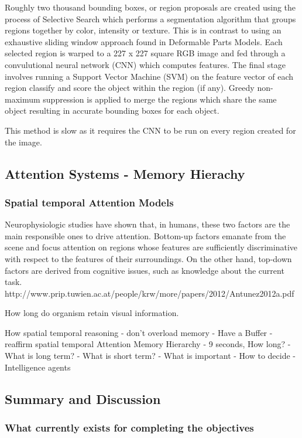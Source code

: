 \documentclass{mproj}
\begin{document}
Roughly two thousand bounding boxes, or region proposals are created using the process of Selective Search which performs a segmentation algorithm that groups regions together by color, intensity or texture.\cite{Sande2013} This is in contrast to using an exhaustive sliding window approach found in Deformable Parts Models.\cite{voc-release4} Each selected region is warped to a 227 x 227 square RGB image and fed through a convulutional neural network (CNN) which computes features. The final stage involves running a Support Vector Machine (SVM) on the feature vector of each region classify and score the object within the region (if any). Greedy non-maximum suppression is applied to merge the regions which share the same object resulting in accurate bounding boxes for each object. 

This method is slow as it requires the CNN to be run on every region created for the image.




\subsection{Attention Systems - Memory Hierachy}
\subsubsection{Spatial temporal Attention Models}
Neurophysiologic studies have shown that, in humans, these two 
factors are the main responsible ones to drive attention. Bottom-up factors emanate from the scene and 
focus attention on regions whose features are sufficiently discriminative with respect to the features 
of their surroundings. On the other hand, top-down factors are derived from cognitive issues, such as 
knowledge about the current task.
http://www.prip.tuwien.ac.at/people/krw/more/papers/2012/Antunez2012a.pdf

How long do organism retain visual information.

How spatial temporal reasoning
- don't overload memory
- Have a Buffer
- reaffirm spatial temporal Attention
Memory Hierarchy
- 9 seconds, How long?
- What is long term?
- What is short term? 
- What is important
- How to decide
- Intelligence agents



\subsection{Summary and Discussion}
\subsubsection{What currently exists for completing the objectives}
\end{document}
